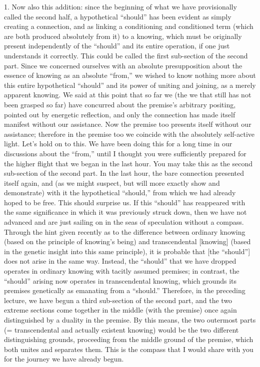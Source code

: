 1. Now also this addition:
since the beginning of what we
have provisionally called the second half,
a hypothetical “should” has been evident
as simply creating a connection,
and as linking a conditioning and conditioned term
(which are both produced absolutely from it)
to a knowing, which must be originally present
independently of the “should”
and its entire operation,
if one just understands it correctly.
This could be called the first
sub-section of the second part.
Since we concerned ourselves with
an absolute presupposition about
the essence of knowing as an absolute “from,”
we wished to know nothing more about
this entire hypothetical “should”
and its power of uniting and joining,
as a merely apparent knowing.
We said at this point that so far we
(the we that still has not been grasped so far)
have concurred about the premise's arbitrary positing,
pointed out by energetic reflection,
and only the connection has made itself manifest
without our assistance.
Now the premise too presents itself without our assistance;
therefore in the premise too we coincide
with the absolutely self-active light.
Let's hold on to this.
We have been doing this for a long time
in our discussions about the “from,”
until I thought you were sufficiently prepared for
the higher flight that we began in the last hour.
You may take this as the second sub-section of the second part.
In the last hour, the bare connection presented itself again,
and (as we might suspect, but will more exactly show and demonstrate)
with it the hypothetical “should,”
from which we had already hoped to be free.
This should surprise us.
If this “should” has reappeared with the same significance
in which it was previously struck down,
then we have not advanced
and are just sailing on
in the seas of speculation without a compass.
Through the hint given recently as to
the difference between ordinary knowing
(based on the principle of knowing's being)
and transcendental [knowing]
(based in the genetic insight into this same principle),
it is probable that [the “should”] does
not arise in the same way.
Instead, the “should” that we have dropped
operates in ordinary knowing
with tacitly assumed premises;
in contrast, the “should” arising now
operates in transcendental knowing,
which grounds its premises genetically
as emanating from a “should.”
Therefore, in the preceding lecture,
we have begun a third sub-section of the second part,
and the two extreme sections come together
in the middle (with the premise) once again
distinguished by a duality in the premise.
By this means, the two outermost parts
(= transcendental and actually existent knowing)
would be the two different distinguishing grounds,
proceeding from the middle ground of the premise,
which both unites and separates them.
This is the compass that I would share with you
for the journey we have already begun.

